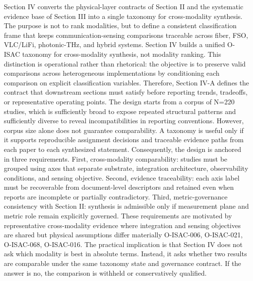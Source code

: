{}
\markdownRendererSectionEnd 
\markdownRendererSectionEnd \markdownRendererSectionBegin
{}\markdownRendererInterblockSeparator
{}Section IV converts the physical-layer contracts of Section II and the systematic evidence base of Section III into a single taxonomy for cross-modality synthesis. The purpose is not to rank modalities, but to define a consistent classification frame that keeps communication-sensing comparisons traceable across fiber, FSO, VLC/LiFi, photonic-THz, and hybrid systems.\markdownRendererInterblockSeparator
{}\markdownRendererSectionBegin
{}\markdownRendererInterblockSeparator
{}\markdownRendererSectionBegin
{}\markdownRendererInterblockSeparator
{}Section IV builds a unified O-ISAC taxonomy for cross-modality synthesis, not modality ranking. This distinction is operational rather than rhetorical: the objective is to preserve valid comparisons across heterogeneous implementations by conditioning each comparison on explicit classification variables. Therefore, Section IV-A defines the contract that downstream sections must satisfy before reporting trends, tradeoffs, or representative operating points.\markdownRendererParagraphSeparator
{}The design starts from a corpus of N=220 studies, which is sufficiently broad to expose repeated structural patterns and sufficiently diverse to reveal incompatibilities in reporting conventions. However, corpus size alone does not guarantee comparability. A taxonomy is useful only if it supports reproducible assignment decisions and traceable evidence paths from each paper to each synthesized statement. Consequently, the design is anchored in three requirements. First, cross-modality comparability: studies must be grouped using axes that separate substrate, integration architecture, observability conditions, and sensing objective. Second, evidence traceability: each axis label must be recoverable from document-level descriptors and retained even when reports are incomplete or partially contradictory. Third, metric-governance consistency with Section II: synthesis is admissible only if measurement plane and metric role remain explicitly governed.\markdownRendererParagraphSeparator
{}These requirements are motivated by representative cross-modality evidence where integration and sensing objectives are shared but physical assumptions differ materially O-ISAC-006, O-ISAC-021, O-ISAC-068, O-ISAC-016. The practical implication is that Section IV does not ask which modality is best in absolute terms. Instead, it asks whether two results are comparable under the same taxonomy state and governance contract. If the answer is no, the comparison is withheld or conservatively qualified.\markdownRendererInterblockSeparator
